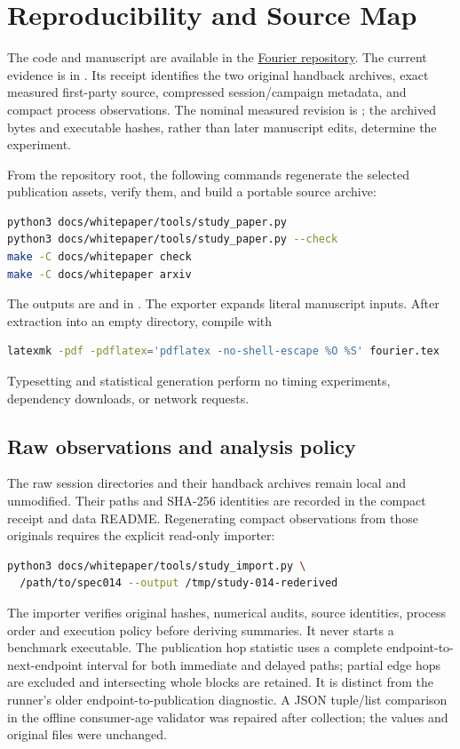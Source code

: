 \section{Reproducibility and Source Map}
\label{app:reproducibility}
The code and manuscript are available in the
\href{https://github.com/Arhythmetic-Units/Fourier}{Fourier repository}.
The current evidence is in . Its receipt
identifies the two original handback archives, exact measured first-party
source, compressed session/campaign metadata, and compact process observations.
The nominal measured revision is
; the archived bytes and executable
hashes, rather than later manuscript edits, determine the experiment.

From the repository root, the following commands regenerate the selected
publication assets, verify them, and build a portable source archive:
\begin{lstlisting}[language=bash]
python3 docs/whitepaper/tools/study_paper.py
python3 docs/whitepaper/tools/study_paper.py --check
make -C docs/whitepaper check
make -C docs/whitepaper arxiv
\end{lstlisting}
The outputs are  and  in
. The exporter expands literal manuscript inputs.
After extraction into an empty directory, compile with
\begin{lstlisting}[language=bash]
latexmk -pdf -pdflatex='pdflatex -no-shell-escape %O %S' fourier.tex
\end{lstlisting}
Typesetting and statistical generation perform no timing experiments,
dependency downloads, or network requests.

\subsection*{Raw observations and analysis policy}
The raw session directories and their handback archives remain local and
unmodified. Their paths and SHA-256 identities are recorded in the compact
receipt and data README. Regenerating compact observations from those originals
requires the explicit read-only importer:
\begin{lstlisting}[language=bash]
python3 docs/whitepaper/tools/study_import.py \
  /path/to/spec014 --output /tmp/study-014-rederived
\end{lstlisting}
The importer verifies original hashes, numerical audits, source identities,
process order and execution policy before deriving summaries. It never starts
a benchmark executable. The publication hop statistic uses a complete
endpoint-to-next-endpoint interval for both immediate and delayed paths;
partial edge hops are excluded and intersecting whole blocks are retained.
It is distinct from the runner's older endpoint-to-publication diagnostic.
A JSON tuple/list comparison in the offline consumer-age validator was repaired
after collection; the values and original files were unchanged.

